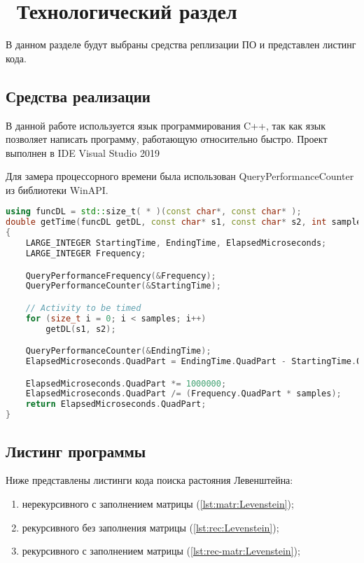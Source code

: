 \chapter{ Технологический раздел}
\label{cha:technological}

    В данном разделе будут выбраны средства реплизации ПО и представлен листинг кода. 

    \section{Средства реализации}
        В данной работе используется язык программирования C++, так как
        язык позволяет написать программу, работающую относительно быстро. 
        Проект выполнен в IDE Visual Studio 2019\cite{visual-studio}

        Для замера процессорного времени была использован QueryPerformanceCounter\cite{QueryPerformanceCounter} 
        из библиотеки WinAPI.

        \begin{lstlisting}[language=C++, caption=Функция замера времени]
using funcDL = std::size_t( * )(const char*, const char* );
double getTime(funcDL getDL, const char* s1, const char* s2, int samples)
{
    LARGE_INTEGER StartingTime, EndingTime, ElapsedMicroseconds;
    LARGE_INTEGER Frequency;

    QueryPerformanceFrequency(&Frequency);
    QueryPerformanceCounter(&StartingTime);

    // Activity to be timed
    for (size_t i = 0; i < samples; i++)
        getDL(s1, s2);

    QueryPerformanceCounter(&EndingTime);
    ElapsedMicroseconds.QuadPart = EndingTime.QuadPart - StartingTime.QuadPart;

    ElapsedMicroseconds.QuadPart *= 1000000;
    ElapsedMicroseconds.QuadPart /= (Frequency.QuadPart * samples);
    return ElapsedMicroseconds.QuadPart;
}
        \end{lstlisting}

    \section{Листинг программы}
        Ниже представлены листинги кода поиска растояния Левенштейна: \begin{enumerate}
            \item нерекурсивного с заполнением матрицы (\ref{lst:matr:Levenstein});
            \item рекурсивного без заполнения матрицы (\ref{lst:rec:Levenstein});
            \item рекурсивного с заполнением матрицы (\ref{lst:rec-matr:Levenstein});
        \end{enumerate}
        
